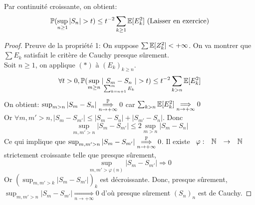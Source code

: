 \documentclass[]{report}
\begin{document}
    \begin{re}{}{}
        Par continuité croissante, on obtient:
        \[\Pa(\sup_{n\ge 1}|S_n|>t)\le t^{-2}\sum_{k\ge 1}\Ea[E_k^2]\text{ (Laisser en exercice)}\]
    \end{re}

    \begin{proof}
        Preuve de la propriété 1: On suppose $\sum \mathbb{E}[Z_k^2]<+\infty$. On va montrer que $\sum E_k$ satisfait le critère de Cauchy presque sûrement.\\
        Soit $n\ge 1$, on applique $(*)$ à $(E_k)_{k\ge n}$.
        \[\forall t>0,\Pa(\sup_{m\ge n}|\underset{\sum_{k=n+1}^{m}E_k}{S_m-S_n}|>t)\le t^{-2}\sum_{k>n} \Ea[E_k^2]\]
        On obtient: $\sup_{m>n}|S_m-S_n|\overunderset{\Pa}{n\to +\infty}{\Longrightarrow} 0$ car $\sum_{k>n}\mathbb{E}[E_k^2]\underset{n\to +\infty}{\Longrightarrow}0$\\
        Or $\forall m,m'>n, |S_m-S_{m'}|\le |S_m-S_n|+|S_{m'}-S_n|$. Donc
        \[\sup_{m,m'>n} |S_m-S_{m'}|\le 2\sup_{m>n}|S_m-S_n|\]
        Ce qui implique que $\sup_{m,m'>n}|S_m-S_{m'}| \overunderset{\Pa}{n\to +\infty}{\Longrightarrow}0$. Il existe $ \begin{array}{ccccc} \varphi : & \mathbb{N} & \to & \mathbb{N} \end{array}$ strictement croissante telle que presque sûrement,
        \[\sup_{m,m'>\varphi(n)}|S_m-S_{m'}|\Longrightarrow 0\]
        Or $(\sup_{m,m'>k}|S_m-S_{m'}|)_k$ est décroissante. Donc, presque sûrement, $\sup_{m,m'>n}|S_m-S_{m'}|\underset{n\to +\infty}{\Longrightarrow} 0$ d'où presque sûrement $(S_n)_n$ est de Cauchy.
    \end{proof}
\end{document}
